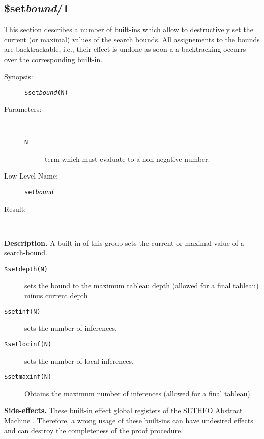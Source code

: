 %
%
%
\subsection{\$set{\em bound\/}/1}

This section describes a number of built-ins which allow to destructively 
set the current (or maximal) values of the search bounds.
All assignements to the bounds are backtrackable, i.e., their effect
is undone as soon a a backtracking occurrs over the corresponding built-in.
\begin{description}
\item[Synopsis:]
	{\tt \$set{\em bound}(N)}
\item[Parameters:]\ \\[-0.5cm]
	\begin{description}
	\item[{\tt N}] term which must evaluate to a non-negative number.
	\end{description}
\item[Low Level Name:]
	{\tt set{\em bound}}
\item[Result:]\ \\
\end{description}

\vspace*{0.5cm}
\noindent
{\bf Description.}
A built-in of this group sets the current or maximal value
of a search-bound.
\begin{description}
\item[{\tt \$setdepth(N)}]
sets the bound to the maximum tableau depth
            (allowed for a final tableau) minus current depth.
\item[{\tt \$setinf(N)}]
   sets the number
            of inferences.
\item[{\tt \$setlocinf(N)}]
   sets the number
            of local inferences.
\item[{\tt \$setmaxinf(N)}]
Obtains the maximum number
            of inferences (allowed for a final tableau).
\end{description}

\vspace*{0.5cm}
\noindent
{\bf Side-effects.}
These built-in effect global registers of the SETHEO Abstract Machine
\SAM.
Therefore, a wrong usage of these built-ins can have undesired effects
and can destroy the completeness of the proof procedure.

